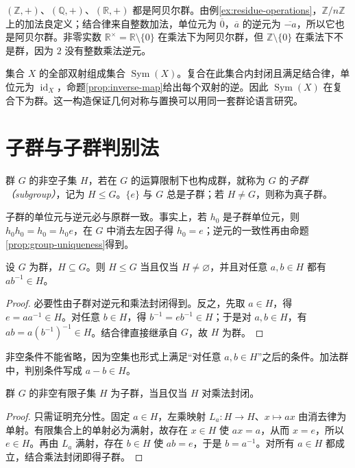 \begin{example}[加法群与乘法群]
$(\mathbb Z,+)$、$(\mathbb Q,+)$、$(\mathbb R,+)$ 都是阿贝尔群。由例\ref{ex:residue-operations}，$\mathbb Z/n\mathbb Z$ 上的加法良定义；结合律来自整数加法，单位元为 $\overline0$，$\overline a$ 的逆元为 $\overline{-a}$，所以它也是阿贝尔群。非零实数 $\mathbb R^\times=\mathbb R\setminus\{0\}$ 在乘法下为阿贝尔群，但 $\mathbb Z\setminus\{0\}$ 在乘法下不是群，因为 $2$ 没有整数乘法逆元。
\end{example}

\begin{example}[双射的复合]
集合 $X$ 的全部双射组成集合 $\operatorname{Sym}(X)$。复合在此集合内封闭且满足结合律，单位元为 $\operatorname{id}_X$，命题\ref{prop:inverse-map}给出每个双射的逆。因此 $\operatorname{Sym}(X)$ 在复合下为群。这一构造保证几何对称与置换可以用同一套群论语言研究。
\end{example}

\section{子群与子群判别法}\label{sec:subgroups}

\begin{definition}[子群]
群 $G$ 的非空子集 $H$，若在 $G$ 的运算限制下也构成群，就称为 $G$ 的\emph{子群（subgroup）}，记为 $H\leq G$。$\{e\}$ 与 $G$ 总是子群；若 $H\ne G$，则称为真子群。
\end{definition}

子群的单位元与逆元必与原群一致。事实上，若 $h_0$ 是子群单位元，则 $h_0h_0=h_0=h_0e$，在 $G$ 中消去左因子得 $h_0=e$；逆元的一致性再由命题\ref{prop:group-uniqueness}得到。

\begin{theorem}[子群判别法]\label{thm:subgroup-test}
设 $G$ 为群，$H\subseteq G$。则 $H\leq G$ 当且仅当 $H\ne\varnothing$，并且对任意 $a,b\in H$ 都有 $ab^{-1}\in H$。
\end{theorem}
\begin{proof}
必要性由子群对逆元和乘法封闭得到。反之，先取 $a\in H$，得 $e=aa^{-1}\in H$。对任意 $b\in H$，得 $b^{-1}=eb^{-1}\in H$；于是对 $a,b\in H$，有 $ab=a(b^{-1})^{-1}\in H$。结合律直接继承自 $G$，故 $H$ 为群。
\end{proof}

非空条件不能省略，因为空集也形式上满足“对任意 $a,b\in H$”之后的条件。加法群中，判别条件写成 $a-b\in H$。

\begin{proposition}[有限子集的判别法]\label{prop:finite-subgroup-test}
群 $G$ 的非空有限子集 $H$ 为子群，当且仅当 $H$ 对乘法封闭。
\end{proposition}
\begin{proof}
只需证明充分性。固定 $a\in H$，左乘映射 $L_a:H\to H$、$x\mapsto ax$ 由消去律为单射。有限集合上的单射必为满射，故存在 $x\in H$ 使 $ax=a$，从而 $x=e$，所以 $e\in H$。再由 $L_a$ 满射，存在 $b\in H$ 使 $ab=e$，于是 $b=a^{-1}$。对所有 $a\in H$ 都成立，结合乘法封闭即得子群。
\end{proof}

